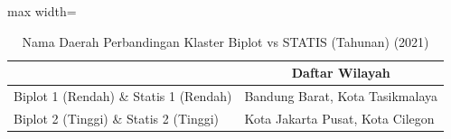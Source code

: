 \begin{table}[H]
\centering
\caption{Nama Daerah Perbandingan Klaster Biplot vs STATIS (Tahunan) (2021)} \label{tab:sample1biplot_statis_comp_name_2021}
\begin{adjustbox}{max width=\textwidth}
\begin{tabular}{|>{\centering\arraybackslash}p{4cm}|p{10cm}|}
\hline
\multicolumn{1}{|c|}{\textbf{Kategori}} & \multicolumn{1}{c|}{\textbf{Daftar Wilayah}} \\
\hline
Biplot 1 (Rendah) \& Statis 1 (Rendah) & Bandung Barat, Kota Tasikmalaya \\
\hline
Biplot 2 (Tinggi) \& Statis 2 (Tinggi) & Kota Jakarta Pusat, Kota Cilegon \\
\hline
\end{tabular}
\end{adjustbox}
\end{table}
